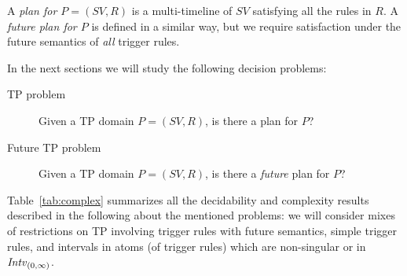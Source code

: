 A \emph{plan for $P=(SV,R)$} is a  multi-timeline of $SV$ satisfying all the rules in $R$. A \emph{future plan for $P$} is defined in a similar way, but we require satisfaction under the future semantics of \emph{all} trigger rules.

In the next sections we will study the following decision problems:
\begin{description}
  \item[TP problem] Given a TP domain $P=(SV,R)$, is there a plan for $P$?
  \item[Future TP problem] Given a TP domain $P\!=\!(SV\!,R)$, is there a \emph{future} plan for $P$?
\end{description}
%

Table~\ref{tab:complex} summarizes all the decidability and complexity results described in the following about the mentioned problems:
we will consider mixes of restrictions on TP involving trigger rules with future semantics, simple trigger rules, and intervals in atoms (of trigger rules) which are non-singular or in ${\mathit{Intv}}_{(0,\infty)}$.

\begin{table}[t]
    \centering    
    \caption{Decidability and complexity of restrictions of the TP problem.}
    \label{tab:complex}
\end{table}
